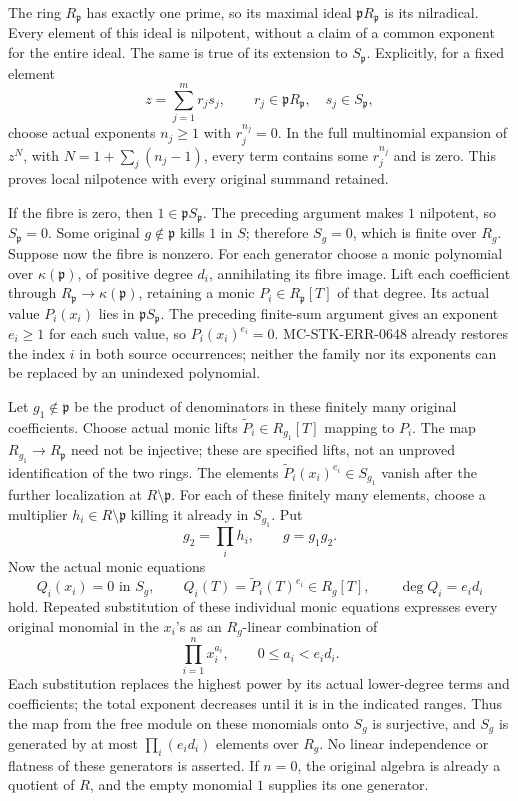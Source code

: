 The ring \(R_{\mathfrak p}\) has exactly one prime, so its maximal ideal \(\mathfrak pR_{\mathfrak p}\) is its nilradical. Every element of this ideal is nilpotent, without a claim of a common exponent for the entire ideal. The same is true of its extension to \(S_{\mathfrak p}\). Explicitly, for a fixed element \[
 z=\sum_{j=1}^m r_js_j,\qquad
 r_j\in\mathfrak pR_{\mathfrak p},\quad s_j\in S_{\mathfrak p},
\] choose actual exponents \(n_j\ge1\) with \(r_j^{n_j}=0\). In the full multinomial expansion of \(z^N\), with \(N=1+\sum_j(n_j-1)\), every term contains some \(r_j^{n_j}\) and is zero. This proves local nilpotence with every original summand retained.

If the fibre is zero, then \(1\in\mathfrak pS_{\mathfrak p}\). The preceding argument makes \(1\) nilpotent, so \(S_{\mathfrak p}=0\). Some original \(g\notin\mathfrak p\) kills \(1\) in \(S\); therefore \(S_g=0\), which is finite over \(R_g\). Suppose now the fibre is nonzero. For each generator choose a monic polynomial over \(\kappa(\mathfrak p)\), of positive degree \(d_i\), annihilating its fibre image. Lift each coefficient through \(R_{\mathfrak p}\to\kappa(\mathfrak p)\), retaining a monic \(P_i\in R_{\mathfrak p}[T]\) of that degree. Its actual value \(P_i(x_i)\) lies in \(\mathfrak pS_{\mathfrak p}\). The preceding finite-sum argument gives an exponent \(e_i\ge1\) for each such value, so \(P_i(x_i)^{e_i}=0\). MC-STK-ERR-0648 already restores the index \(i\) in both source occurrences; neither the family nor its exponents can be replaced by an unindexed polynomial.

Let \(g_1\notin\mathfrak p\) be the product of denominators in these finitely many original coefficients. Choose actual monic lifts \(\widetilde P_i\in R_{g_1}[T]\) mapping to \(P_i\). The map \(R_{g_1}\to R_{\mathfrak p}\) need not be injective; these are specified lifts, not an unproved identification of the two rings. The elements \(\widetilde P_i(x_i)^{e_i}\in S_{g_1}\) vanish after the further localization at \(R\setminus\mathfrak p\). For each of these finitely many elements, choose a multiplier \(h_i\in R\setminus\mathfrak p\) killing it already in \(S_{g_1}\). Put \[
 g_2=\prod_i h_i,\qquad g=g_1g_2.
\] Now the actual monic equations \[
 Q_i(x_i)=0\text{ in }S_g,\qquad
 Q_i(T)=\widetilde P_i(T)^{e_i}\in R_g[T],\qquad
 \deg Q_i=e_id_i
\] hold. Repeated substitution of these individual monic equations expresses every original monomial in the \(x_i\)'s as an \(R_g\)-linear combination of \[
 \prod_{i=1}^n x_i^{a_i},
 \qquad 0\le a_i<e_id_i.
\] Each substitution replaces the highest power by its actual lower-degree terms and coefficients; the total exponent decreases until it is in the indicated ranges. Thus the map from the free module on these monomials onto \(S_g\) is surjective, and \(S_g\) is generated by at most \(\prod_i(e_id_i)\) elements over \(R_g\). No linear independence or flatness of these generators is asserted. If \(n=0\), the original algebra is already a quotient of \(R\), and the empty monomial \(1\) supplies its one generator.

